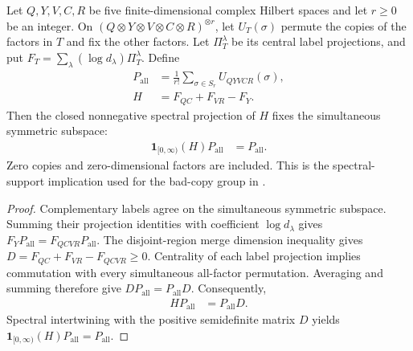 \begin{theorem}
\label{thm:replica-bad-merged-label-support}
\leanok
Let $Q,Y,V,C,R$ be five finite-dimensional complex Hilbert spaces and let $r\ge0$ be an integer.
On $(Q\otimes Y\otimes V\otimes C\otimes R)^{\otimes r}$, let
$U_T(\sigma)$ permute the copies of the factors in $T$ and fix the other
factors. Let $\Pi_T^\lambda$ be its central label projections, and put
$F_T=\sum_\lambda(\log d_\lambda)\Pi_T^\lambda$.
Define
\begin{align*}
 P_{\mathrm{all}}
   &=\frac1{r!}\sum_{\sigma\in S_r}U_{QYVCR}(\sigma),\\
 H&=F_{QC}+F_{VR}-F_Y.
\end{align*}
Then the closed nonnegative spectral projection of $H$ fixes the
simultaneous symmetric subspace:
\begin{align*}
 \mathbf1_{[0,\infty)}(H)P_{\mathrm{all}}&=P_{\mathrm{all}}.
\end{align*}
Zero copies and zero-dimensional factors are included. This is the
spectral-support implication used for the bad-copy group in
\cite[Section~7]{OpenAI2026AreaLaw}.
\end{theorem}

\begin{proof}
\leanok
{}
Complementary labels agree on the simultaneous symmetric subspace.
Summing their projection identities with coefficient $\log d_\lambda$
gives $F_YP_{\mathrm{all}}=F_{QCVR}P_{\mathrm{all}}$.
The disjoint-region merge dimension inequality gives
$D=F_{QC}+F_{VR}-F_{QCVR}\ge0$.
Centrality of each label projection implies commutation with every
simultaneous all-factor permutation. Averaging and summing therefore give
$DP_{\mathrm{all}}=P_{\mathrm{all}}D$. Consequently,
\begin{align*}
 HP_{\mathrm{all}}&=P_{\mathrm{all}}D.
\end{align*}
Spectral intertwining with the positive semidefinite matrix $D$ yields
$\mathbf1_{[0,\infty)}(H)P_{\mathrm{all}}=P_{\mathrm{all}}$.
\end{proof}
